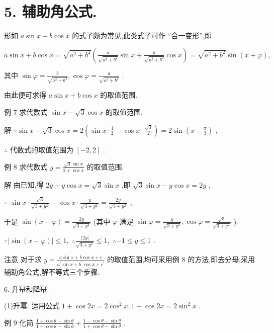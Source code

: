 \documentclass[10pt]{article}
\begin{document}
\section*{5. 辅助角公式.}

形如 \(a\sin x + b\cos x\) 的式子颇为常见,此类式子可作 “合一变形”,即

\(a\sin x + b\cos x = \sqrt{{a}^{2} + {b}^{2}}\left( {\frac{a}{\sqrt{{a}^{2} + {b}^{2}}}\sin x + \frac{b}{\sqrt{{a}^{2} + {b}^{2}}}\cos x}\right)  = \sqrt{{a}^{2} + {b}^{2}}\sin \left( {x + \varphi }\right) ,\)

其中 \(\sin \varphi  = \frac{b}{\sqrt{{a}^{2} + {b}^{2}}},\cos \varphi  = \frac{a}{\sqrt{{a}^{2} + {b}^{2}}}\) .

由此便可求得 \(a\sin x + b\cos x\) 的取值范围.

例 7 求代数式 \(\sin x - \sqrt{3}\cos x\) 的取值范围.

解 \(\because \sin x - \sqrt{3}\cos x = 2\left( {\sin x \cdot  \frac{1}{2} - \cos x \cdot  \frac{\sqrt{3}}{2}}\right)  = 2\sin \left( {x - \frac{\pi }{3}}\right)\) ,

\(\therefore\) 代数式的取值范围为 \(\left\lbrack  {-2,2}\right\rbrack\) .

例 8 求代数式 \(y = \frac{\sqrt{3}\sin x}{2 + \cos x}\) 的取值范围.

解 由已知,得 \({2y} + y\cos x = \sqrt{3}\sin x\) ,即 \(\sqrt{3}\sin x - y\cos x = {2y}\) ,

\(\therefore \;\sin x \cdot  \frac{\sqrt{3}}{\sqrt{3 + {y}^{2}}} - \cos x \cdot  \frac{y}{\sqrt{3 + {y}^{2}}} = \frac{2y}{\sqrt{3 + {y}^{2}}}\) ,

于是 \(\sin \left( {x - \varphi }\right)  = \frac{2y}{\sqrt{3 + {y}^{2}}}\) (其中 \(\varphi\) 满足 \(\sin \varphi  = \frac{y}{\sqrt{3 + {y}^{2}}},\cos \varphi  = \frac{\sqrt{3}}{\sqrt{3 + {y}^{2}}}\) ).

\(\because \left| {\sin \left( {x - \varphi }\right) }\right|  \leq  1,\;\therefore \frac{\left| 2y\right| }{\sqrt{3 + {y}^{2}}} \leq  1,\;\therefore  - 1 \leq  y \leq  1\) .

注意 对于求 \(y = \frac{a\sin x + b\cos x + c}{{a}^{\prime }\sin x + {b}^{\prime }\cos x + {c}^{\prime }}\) 的取值范围,均可采用例 8 的方法,即去分母,采用辅助角公式,解不等式三个步骤.

6. 升幂和降幂.

(1)升幂. 运用公式 \(1 + \cos {2x} = 2{\cos }^{2}x,1 - \cos {2x} = 2{\sin }^{2}x\) .

例 9 化简 \(\frac{1 + \cos \theta  - \sin \theta }{1 - \cos \theta  - \sin \theta } + \frac{1 - \cos \theta  - \sin \theta }{1 + \cos \theta  - \sin \theta }\) .
\end{document}

